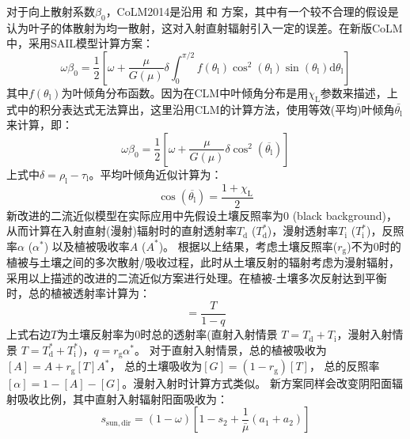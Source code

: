 对于向上散射系数$\beta_0$，CoLM2014是沿用 \citet{dickinson1983land} 和 \citet{sellers1985canopy} 方案，其中有一个较不合理的假设是认为叶子的体散射为均一散射，这对入射直射辐射引入一定的误差。在新版CoLM中，采用SAIL模型计算方案：
\begin{equation}
  \omega \beta_{0}=\frac{1}{2}\left[\omega+\frac{\mu}{G(\mu)} \delta \int_{0}^{\pi / 2}
  f\left(\theta_{\mathrm{l}}\right) \cos ^{2}\left(\theta_{\mathrm{l}}\right) \sin \left(\theta_{\mathrm{l}}\right) {\mathrm d} \theta_{\mathrm{l}}\right]
\end{equation}
其中$f\left(\theta_{\mathrm {l}}\right)$为叶倾角分布函数。因为在CLM中叶倾角分布是用$\chi_{\mathrm L}$参数来描述，上式中的积分表达式无法算出，这里沿用CLM的计算方法，使用等效(平均)叶倾角$\bar{\theta_{\mathrm {l}}}$来计算，即：
\begin{equation}
  \omega \beta_{0}=\frac{1}{2}\left[\omega+\frac{\mu}{G(\mu)} \delta \cos ^{2}\left(\overline{\theta_{\mathrm{l}}}\right)\right]
\end{equation}
上式中$\delta=\rho_{\mathrm {l}}-\tau_{\mathrm {l}}$。平均叶倾角近似计算为：
\begin{equation}
  \cos \left(\overline{\theta_{\mathrm{l}}}\right)=\frac{1+\chi_{\mathrm{L}}}{2}
\end{equation}
新改进的二流近似模型在实际应用中先假设土壤反照率为0 (black background)，从而计算在入射直射(漫射)辐射时的直射透射率$T_{\mathrm d}$ ($T_{\mathrm d}^\ast$)，漫射透射率$T_{\mathrm i}$ ($T_{\mathrm i}^\ast$)，反照率$\alpha$ ($\alpha^\ast$) 以及植被吸收率$A$ ($A^\ast$)。
根据以上结果，考虑土壤反照率($r_{\mathrm g}$)不为0时的植被与土壤之间的多次散射/吸收过程，此时从土壤反射的辐射考虑为漫射辐射，采用以上描述的改进的二流近似方案进行处理。在植被-土壤多次反射达到平衡时，总的植被透射率计算为：
\begin{equation}
  [T]=\frac{T}{1-q}
\end{equation}
上式右边$T$为土壤反射率为0时总的透射率(直射入射情景 $T=T_{\mathrm d}+T_{\mathrm i}$，漫射入射情景 $T=T_{\mathrm d}^\ast+T_{\mathrm i}^\ast$)，$q=r_{\mathrm {g}}\alpha^\ast$。
对于直射入射情景，总的植被吸收为$\left[A\right]=A+r_{\mathrm {g}}\left[T\right]A^\ast$，
总的土壤吸收为$\left[G\right]=\left(1-r_{\mathrm {g}}\right)\left[T\right]$，
总的反照率$\left[\alpha\right]=1-\left[A\right]-\left[G\right]$。漫射入射时计算方式类似。
新方案同样会改变阴阳面辐射吸收比例，其中直射入射辐射阳面吸收为：
\begin{equation}
  s_{\mathrm{sun,dir}}=(1-\omega)\left[1-s_{2}+\frac{1}{\bar{\mu}}\left(a_{1}+a_{2}\right)\right]
\end{equation}
